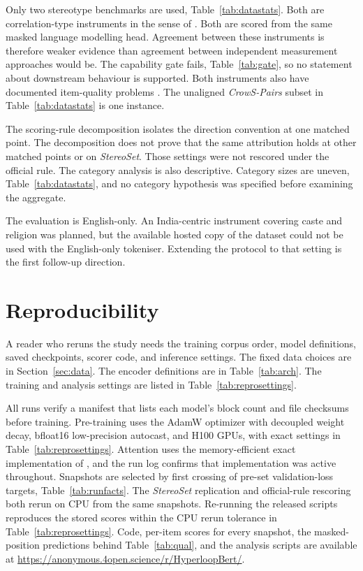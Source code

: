 \documentclass[sigconf,natbib=true,anonymous=true]{acmart}
\begin{document}
Only two stereotype benchmarks are used, Table~\ref{tab:datastats}. Both are
correlation-type instruments in the sense of \citet{wang2025difference}. Both
are scored from the same masked language modelling head. Agreement between these
instruments is therefore weaker evidence than agreement between independent
measurement approaches would be. The capability gate fails,
Table~\ref{tab:gate}, so no statement about downstream behaviour is supported.
Both instruments also have documented item-quality problems
\citep{blodgett2021salmon}. The unaligned \emph{CrowS-Pairs} subset in
Table~\ref{tab:datastats} is one instance.

The scoring-rule decomposition isolates the direction convention at one matched
point. The decomposition does not prove that the same attribution holds at other
matched points or on \emph{StereoSet}. Those settings were not rescored under
the official rule. The category analysis is also descriptive. Category sizes are
uneven, Table~\ref{tab:datastats}, and no category hypothesis was specified
before examining the aggregate.

The evaluation is English-only. An India-centric instrument covering caste and
religion \citep{khandelwal2023indianbhed} was planned, but the available hosted
copy of the dataset could not be used with the English-only tokeniser. Extending
the protocol to that setting is the first follow-up direction.

\section{Reproducibility}
\label{sec:repro}

A reader who reruns the study needs the training corpus order, model
definitions, saved checkpoints, scorer code, and inference settings. The fixed
data choices are in Section~\ref{sec:data}. The encoder definitions are in
Table~\ref{tab:arch}. The training and analysis settings are listed in
Table~\ref{tab:reprosettings}.

All runs verify a manifest that lists each model's block count and file
checksums before training. Pre-training uses the AdamW optimizer with decoupled
weight decay, bfloat16 low-precision autocast, and H100 GPUs, with exact
settings in Table~\ref{tab:reprosettings}. Attention uses the memory-efficient
exact implementation of \citet{dao2022flashattention}, and the run log confirms
that implementation was active throughout. Snapshots are selected by first
crossing of pre-set validation-loss targets, Table~\ref{tab:runfacts}. The
\emph{StereoSet} replication and official-rule rescoring both rerun on CPU from
the same snapshots. Re-running the released scripts reproduces the stored scores
within the CPU rerun tolerance in Table~\ref{tab:reprosettings}.
Code, per-item scores for every snapshot, the masked-position predictions behind
Table~\ref{tab:qual}, and the analysis scripts are available at
\url{https://anonymous.4open.science/r/HyperloopBert/}.
\end{document}

